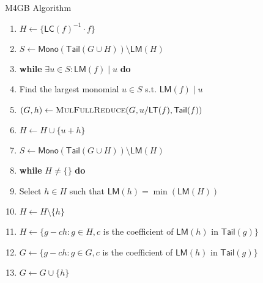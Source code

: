 \documentclass{beamer}
\newcommand{\LT}[1]{\mathsf{LT}(#1)}
\newcommand{\LM}[1]{\mathsf{LM}(#1)}
\newcommand{\LC}[1]{\mathsf{LC}(#1)}
\newcommand{\Tail}[1]{\mathsf{Tail}(#1)}
\newcommand{\Mono}[1]{\mathsf{Mono}(#1)}
\newcommand{\Alg}[2]{\textsc{#1}(#2)}
\newcommand{\MulFullReduce}[1]{\Alg{MulFullReduce}{#1}}
\begin{document}
\begin{section}{M4GB Algorithm}
\begin{frame}
    \begin{enumerate}
    \item<2-> $H \leftarrow \{ \LC{f}^{-1} \cdot f \}$
    \item<2-> $S \leftarrow \Mono{\Tail{G \cup H}} \setminus \LM{H}$
    \item<3-> \textbf{while}
      $\exists u \in S : \LM{f}
      \mid u$ \textbf{do}
    \item<4-> \quad Find the largest monomial $u \in S$ s.t. $\LM{f} \mid u$
    \item<5-> \quad
      $(G, h) \leftarrow \MulFullReduce{G, u/\LT{f}, \Tail{f}}$
    \item<6-> \quad $H \leftarrow H \cup \{ u + h\}$
    \item<7-> \quad $S \leftarrow \Mono{\Tail{G \cup H}} \setminus \LM{H}$
    \item<8-> \textbf{while} $H \neq \{ \}$ \textbf{do}
    \item<9-> \quad Select $h \in H$ such that $\LM{h} = \min (\LM{H})$
    \item<10-> \quad $H \leftarrow H \setminus \{ h\}$
    \item<11-> \quad $H \leftarrow \{ g - ch : g \in H, c$ is the
      coefficient of $\LM{h}$ in $\Tail{g} \}$
    \item<12-> \quad $G \leftarrow \{ g - ch : g \in G, c$ is the
      coefficient of $\LM{h}$ in $\Tail{g} \}$
    \item<13-> \quad $G \leftarrow G \cup \{ h \}$
    \end{enumerate}
    
        


\end{frame}
\end{section}
\end{document}
